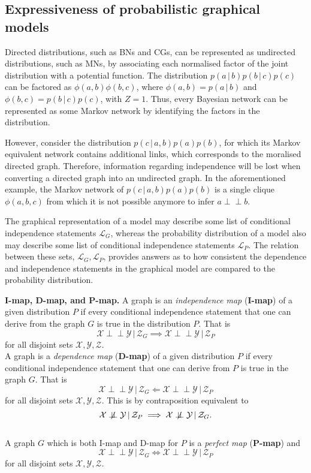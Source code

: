 \documentclass{article}
\newcommand{\giv}{\,|\,}
\newcommand{\indep}{\perp \!\!\! \perp}
\newcommand{\dep}{\centernot{\indep}}
\begin{document}
\subsection{Expressiveness of probabilistic graphical models}

Directed distributions, such as BNs and CGs, can be represented as undirected distributions, such as MNs, by associating each normalised factor of the joint distribution with a potential function. The distribution $p(a \giv b)p(b \giv c)p(c)$ can be factored as $\phi(a, b)\phi(b, c)$, where $\phi(a, b) = p(a \giv b)$ and $\phi(b, c) = p(b \giv c)p(c)$, with $Z = 1$. Thus, every Bayesian network can be represented as some Markov network by identifying the factors in the distribution. 

However, consider the distribution $p(c \giv a, b) p(a) p(b)$, for which its Markov equivalent network contains additional links, which corresponds to the moralised directed graph. Therefore, information regarding independence will be lost when converting a directed graph into an undirected graph. In the aforementioned example, the Markov network of $p(c \giv a, b) p(a) p(b)$ is a single clique $\phi(a, b, c)$ from which it is not possible anymore to infer $a \indep b$. 

The graphical representation of a model may describe some list of conditional independence statements $\mathcal{L}_G$, whereas the probability distribution of a model also may describe some list of conditional independence statements $\mathcal{L}_P$. The relation between these sets, $\mathcal{L}_G, \mathcal{L}_P$, provides answers as to how consistent the dependence and independence statements in the graphical model are compared to the probability distribution. 
\\
\begin{theorem}
    \textbf{I-map, D-map, and P-map.} A graph is an \textit{independence map} (\textbf{I-map}) of a given distribution $P$ if every conditional independence statement that one can derive from the graph $G$ is true in the distribution $P$. That is
    $$
        \mathcal{X} \indep \mathcal{Y} \giv \mathcal{Z}_G \implies \mathcal{X} \indep \mathcal{Y} \giv \mathcal{Z}_P
    $$
    for all disjoint sets $\mathcal{X}, \mathcal{Y}, \mathcal{Z}$.
    \\
    A graph is a \textit{dependence map} (\textbf{D-map}) of a given distribution $P$ if every conditional independence statement that one can derive from $P$ is true in the graph $G$. That is
    $$
        \mathcal{X} \indep \mathcal{Y} \giv \mathcal{Z}_G \Longleftarrow \mathcal{X} \indep \mathcal{Y} \giv \mathcal{Z}_P
    $$
    for all disjoint sets $\mathcal{X}, \mathcal{Y}, \mathcal{Z}$. This is by contraposition equivalent to 
    $$
        \mathcal{X} \dep \mathcal{Y} \giv \mathcal{Z}_P \implies \mathcal{X} \dep \mathcal{Y} \giv \mathcal{Z}_G .
    $$
    \\
    A graph $G$ which is both I-map and D-map for $P$ is a \textit{perfect map} (\textbf{P-map}) and 
    $$
        \mathcal{X} \indep \mathcal{Y} \giv \mathcal{Z}_G \iff \mathcal{X} \indep \mathcal{Y} \giv \mathcal{Z}_P
    $$
    for all disjoint sets $\mathcal{X}, \mathcal{Y}, \mathcal{Z}$.
\end{theorem}
\end{document}
